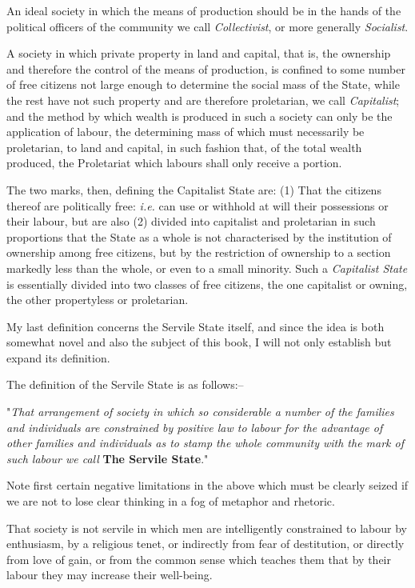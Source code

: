 \documentclass{book}
\newcommand\mdstrong[1]{\textbf{#1}}
\begin{document}
An ideal society in which the means of production should be in the hands of the political officers of the community we call \emph{Collectivist}, or more generally \emph{Socialist}.\footnotemark[1]

A society in which private property in land and capital, that is, the ownership and therefore the control of the means of production, is confined to some number of free citizens not large enough to determine the social mass of the State, while the rest have not such property and are therefore proletarian, we call \emph{Capitalist}; and the method by which wealth is produced in such a society can only be the application of labour, the determining mass of which must necessarily be proletarian, to land and capital, in such fashion that, of the total wealth produced, the Proletariat which labours shall only receive a portion.

The two marks, then, defining the Capitalist State are: (1) That the citizens thereof are politically free: \emph{i.e.} can use or withhold at will their possessions or their labour, but are also (2) divided into capitalist and proletarian in such proportions that the State as a whole is not characterised by the institution of ownership among free citizens, but by the restriction of ownership to a section markedly less than the whole, or even to a small minority. Such a \emph{Capitalist State} is essentially divided into two classes of free citizens, the one capitalist or owning, the other propertyless or proletarian.

My last definition concerns the Servile State itself, and since the idea is both somewhat novel and also the subject of this book, I will not only establish but expand its definition.

The definition of the Servile State is as follows:–

"\emph{That arrangement of society in which so considerable a number of the families and individuals are constrained by positive law to labour for the advantage of other families and individuals as to stamp the whole community with the mark of such labour we call} \mdstrong{The Servile State}."

Note first certain negative limitations in the above which must be clearly seized if we are not to lose clear thinking in a fog of metaphor and rhetoric.

That society is not servile in which men are intelligently constrained to labour by enthusiasm, by a religious tenet, or indirectly from fear of destitution, or directly from love of gain, or from the common sense which teaches them that by their labour they may increase their well-being.
\end{document}
